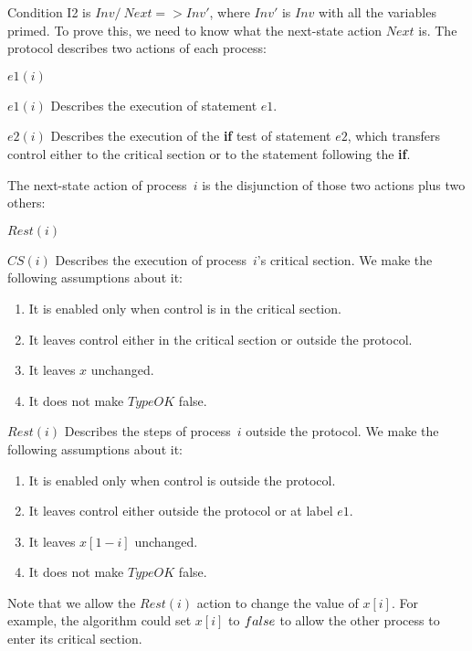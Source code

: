 \documentclass[fleqn,leqno]{article}
\begin{document}
Condition I2 is $Inv /\ Next => Inv'$, where $Inv'$ is $Inv$ with all
the variables primed.  To prove this, we need to know what the
next-state action $Next$ is.  The protocol describes two actions
of each process:
\begin{display}
\begin{describe}{$e1(i)$}
\item[$e1(i)$] Describes the execution of statement $e1$.

\item[$e2(i)$] Describes the execution of the \textbf{if} test
of statement $e2$, which transfers control either to the critical
section or to the statement following the \textbf{if}.
\end{describe}
\end{display}
The next-state action of process~$i$ is the disjunction of those two
actions plus two others:
\begin{display}
\begin{describe}{$Rest(i)$}
\item[$CS(i)$] Describes the execution of process~$i$'s critical
section.  We make the following assumptions about it:
\begin{enumerate}
\item It is enabled only when control is in the critical section.

\item It leaves control either in the critical section or outside
       the protocol.
\item It leaves $x$ unchanged.

\item It does not make $TypeOK$ false.
\end{enumerate}

\item[$Rest(i)$] Describes the steps of process~$i$ outside the
protocol.  We make the following assumptions about it:
\begin{enumerate}
\item It is enabled only when control is outside the protocol.

\item It leaves control either outside the protocol or at label $e1$.

\item It leaves $x[1-i]$ unchanged.

\item It does not make $TypeOK$ false.
\end{enumerate}
Note that we allow the $Rest(i)$ action to change the value of
$x[i]$.  For example, the algorithm could set $x[i]$ to $\FALSE$
to allow the other process to enter its critical section.
\end{describe}
\end{display}
\end{document}
